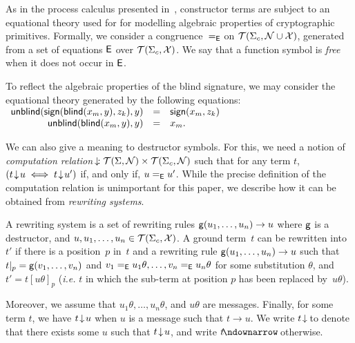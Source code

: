 As in the process calculus presented in~\cite{BlanchetAbadiFournetJLAP08}, 
constructor terms are subject to an equational theory
used for
for modelling algebraic properties of cryptographic primitives.
Formally, we consider a congruence~$=_{\mathsf{E}}$ on $\mathcal{T}(\Sigma_c,\mathcal{N} \cup \mathcal{X})$,
generated from a set of equations $\mathsf{E}$ over $\mathcal{T}(\Sigma_c,\mathcal{X})$.
We say that a function symbol is {\em free} when it does not occur
in $\mathsf{E}$.
\begin{example}
\label{ex:app:xor}
To reflect the algebraic properties of the blind signature, we may
consider the equational theory generated by the following equations:\\[1mm]
\null\hfill$
\begin{array}{rcl}
\mathsf{unblind}(\mathsf{sign}(\mathsf{blind}(x_m,y),z_k),y) &=& \mathsf{sign}(x_m,z_k)\\
\mathsf{unblind}(\mathsf{blind}(x_m,y),y) &=& x_m. \\
\end{array}$\hfill\null
\end{example}



\label{sec:app:comp}
We can also give a meaning to destructor symbols.
For this, we need a notion of \emph{computation relation}
$\!\downarrow\! : \mathcal{T}(\Sigma,\mathcal{N})\times\mathcal{T}(\Sigma_c,\mathcal{N})$ such that
for any term $t$, $(t\!\downarrow\! u\iff t\!\downarrow\! u')$ if, and only if, $u=_{\mathsf{E}} u'$.
While the precise definition of the computation relation is unimportant
for this paper, we describe how it can be obtained from \emph{rewriting systems}.

A rewriting system is a set of rewriting
rules %
${\mathsf{g}(u_1,\ldots, u_n) \to u}$ where $\mathsf{g}$ is a
destructor, and $u, u_1, \ldots, u_n \in \mathcal{T}(\Sigma_c,\mathcal{X})$.
A ground term~$t$ can be rewritten into $t'$ if there is  a
position~$p$ in~$t$ 
and a rewriting rule $\mathsf{g}(u_1,\ldots, u_n) \to u$
such that $t|_p = \mathsf{g}(v_1,\ldots,v_n)$ and $v_1 =_{\mathsf{E}} u_1\theta, \ldots, v_n=_{\mathsf{E}} u_n\theta$ for
some substitution $\theta$, and $t' = t[u\theta]_p$ (\emph{i.e.} $t$
in which the sub-term at position $p$ has been replaced by~$u\theta$).

Moreover, we assume that $u_1\theta,
\ldots, u_n\theta$, and $u\theta$ are messages.
Finally, for some term $t$, we have $t\!\downarrow\! u$ when $u$ is a message such that 
$t\to u$. We write $t\!\downarrow\!$ to denote that there exists some $u$ such
that $t\!\downarrow\! u$, and write
$t\redcb$ otherwise.

